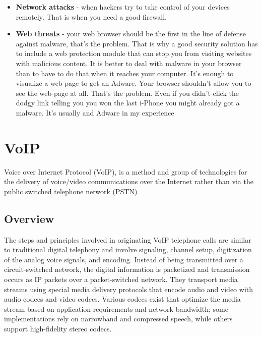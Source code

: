 \documentclass[a4paper,12pt]{book}
\begin{document}
\begin{itemize}
\item{\textbf{Network attacks} - when hackers try to take control of your devices remotely. That is when you need a good firewall.}
\item{\textbf{Web threats} - your web browser should be the first in the line of defense against malware, that's the problem. That is why a good security solution has to include a web protection module that can stop you from visiting websites with malicious content. It is better to deal with malware in your browser than to have to do that when it reaches your computer. It's enough to visualize a web-page to get an Adware. Your browser shouldn't allow you to see the web-page at all. That's the problem. Even if you didn't click the dodgy link telling you you won the last i-Phone you might already got a malware. It's usually and Adware in my experience}
\end{itemize}

\clearpage

\section{VoIP}
Voice over Internet Protocol (VoIP), is a method and group of technologies for the delivery of voice/video communications over the Internet rather than via the public switched telephone network (PSTN)

\subsection{Overview}
The steps and principles involved in originating VoIP telephone calls are similar to traditional digital telephony and involve signaling, channel setup, digitization of the analog voice signals, and encoding. Instead of being transmitted over a circuit-switched network, the digital information is packetized and transmission occurs as IP packets over a packet-switched network. They transport media streams using special media delivery protocols that encode audio and video with audio codecs and video codecs. Various codecs exist that optimize the media stream based on application requirements and network bandwidth; some implementations rely on narrowband and compressed speech, while others support high-fidelity stereo codecs.

\end{document}
